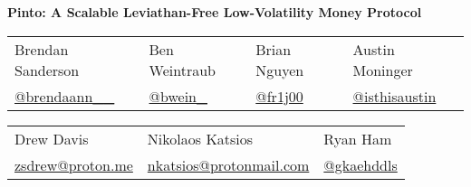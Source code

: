 \documentclass[tikz]{article}
\newcommand{\PintoCover}{} %
\begin{document}
\thispagestyle{empty} %
\begin{titlepage}
    \begin{center}
        \vspace*{-0.1cm}
        \begin{changemargin}{-0.8cm}{-0.8cm}
            \centering %
            \textbf{\Large{Pinto: A Scalable Leviathan-Free Low-Volatility Money Protocol}}
        \end{changemargin}

        
        \begin{center}
            \PintoCover
        \end{center}


        \begin{center}
            \begin{tabular}{>{\centering\arraybackslash}p{3.2cm} >{\centering\arraybackslash}p{3.2cm} >{\centering\arraybackslash}p{3.2cm} >{\centering\arraybackslash}p{3.2cm}}
                Brendan Sanderson & Ben Weintraub & Brian Nguyen & Austin Moninger \\
                \href{https://x.com/brendaann__}{\normalsize{@brendaann\_\_}} & \href{https://x.com/bwein_}{\normalsize{@bwein\_}} & \href{https://x.com/fr1j00}{\normalsize{@fr1j00}} & \href{https://x.com/isthisaustin}{\normalsize{@isthisaustin}}
            \end{tabular}
        \end{center}
        
        \vspace*{-0.52cm}

        \begin{center}
            \begin{tabular}{>{\centering\arraybackslash}p{4.6cm} >{\centering\arraybackslash}p{4.6cm} >{\centering\arraybackslash}p{4.6cm}}
                Drew Davis & Nikolaos Katsios & Ryan Ham \\
                \href{mailto:zsdrew@proton.me}{\normalsize{zsdrew@proton.me}} & \href{mailto:nkatsios@protonmail.com}{\normalsize{nkatsios@protonmail.com}} & \href{https://x.com/gkaehddls}{\normalsize{@gkaehddls}}
            \end{tabular}
        \end{center}


\end{center}
\end{titlepage}
\end{document}
